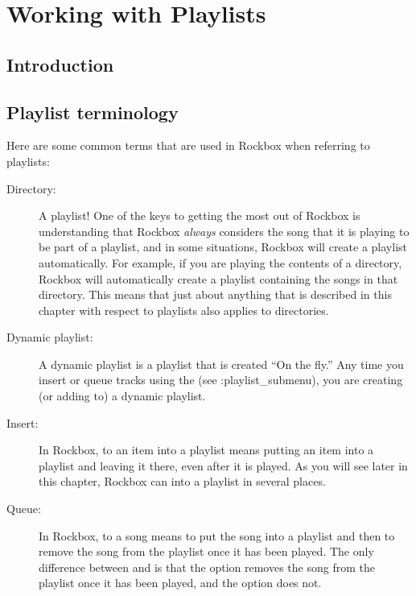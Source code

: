 \chapter{Working with Playlists}
\label{ref:working_with_playlists}

\section{Introduction}

\section{Playlist terminology}

Here are some common terms that are used in Rockbox when referring to playlists:

	\begin{description}
	
	\item[Directory:]  A playlist!  One of the keys to getting the most out of 
	Rockbox is understanding that Rockbox \emph{always} considers the song that it 
	is playing to be part of a playlist, and in some situations, Rockbox will 
	create a playlist automatically.  For example, if you are playing the contents 
	of a directory, Rockbox will automatically create a playlist containing the 
	songs in that directory.  This means that just about anything that is 
	described in this chapter with respect to playlists also applies to 
	directories.
	
	\item[Dynamic playlist:]  A dynamic playlist is a playlist that is created 
	``On the fly.''  Any time you insert or queue tracks using the 
	 (see :{playlist_submenu}), you are creating (or adding 
	to) a dynamic playlist.
	
	\item[Insert:] In Rockbox, to  an item into a playlist means 
	putting an item into a playlist and leaving it there, even after it is played. 
	As you will see later in this chapter, Rockbox can  into a 
	playlist in several places.
	
	\item[Queue:]  In Rockbox, to  a song means to put the song 
	into a playlist and then to remove the song from the playlist once it has been 
	played.  The only difference between  and  is 
	that the  option removes the song from the playlist once it has 
	been played, and the  option does not.


\end{description}
